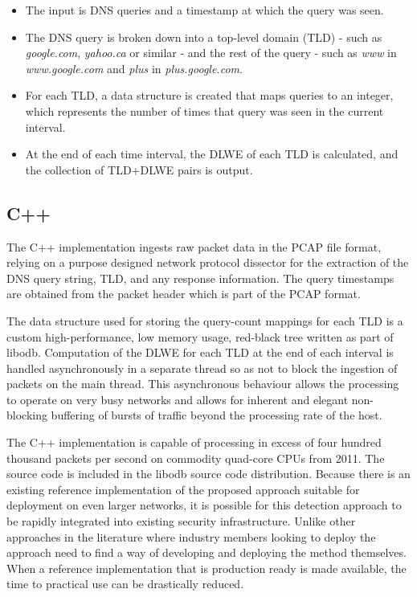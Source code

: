 \documentclass[12pt]{report}
\theoremstyle{remark}
\theoremstyle{definition}
\theoremstyle{definition}
\theoremstyle{definition}
\begin{document}
\begin{itemize}

\item The input is DNS queries and a timestamp at which the query was seen.

\item The DNS query is broken down into a top-level domain (TLD) - such as
\emph{google.com}, \emph{yahoo.ca} or similar - and the rest of the query - such
as \emph{www} in \emph{www.google.com} and \emph{plus} in
\emph{plus.google.com}.

\item For each TLD, a data structure is created that maps queries to an integer,
which represents the number of times that query was seen in the current
interval.

\item At the end of each time interval, the DLWE of each TLD is calculated, and
the collection of TLD+DLWE pairs is output.

\end{itemize}

\subsection{C++}
\label{cpp-implementation}
The C++ implementation ingests raw packet data in the PCAP file
format, relying on a purpose designed network protocol dissector for the
extraction of the DNS query string, TLD, and any response information. The query
timestamps are obtained from the packet header which is part of the PCAP format.

The data structure used for storing the query-count mappings for each TLD is a
custom high-performance, low memory usage, red-black tree written as part of
libodb\cite{Friesen2013}. Computation of the DLWE for each TLD at the end of
each interval is handled asynchronously in a separate thread so as not to block
the ingestion of packets on the main thread. This asynchronous behaviour allows
the processing to operate on very busy networks and allows for inherent and
elegant non-blocking buffering of bursts of traffic beyond the processing rate
of the host.

The C++ implementation is capable of processing in excess of four hundred
thousand packets per second on commodity quad-core CPUs from 2011. The source
code is included in the libodb source code distribution\cite{Friesen2013}.
Because there is an existing reference implementation of the proposed approach
suitable for deployment on even larger networks, it is possible for this
detection approach to be rapidly integrated into existing security
infrastructure. Unlike other approaches in the literature where industry members
looking to deploy the approach need to find a way of developing and deploying
the method themselves. When a reference implementation that is production ready
is made available, the time to practical use can be drastically reduced.
\end{document}
